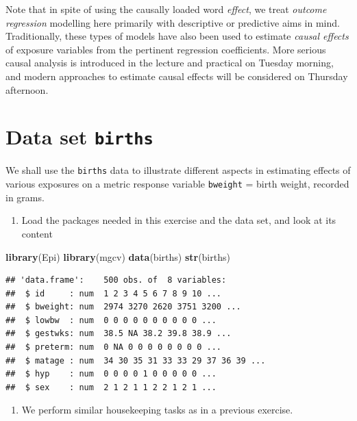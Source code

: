 \documentclass[
]{book}
\newenvironment{Shaded}{\begin{snugshade}}{\end{snugshade}}
\newcommand{\FunctionTok}[1]{\textcolor[rgb]{0.13,0.29,0.53}{\textbf{#1}}}
\newcommand{\NormalTok}[1]{#1}
\providecommand{\tightlist}{%
  \setlength{\itemsep}{0pt}\setlength{\parskip}{0pt}}
\begin{document}
Note that in spite of using the causally loaded word \emph{effect},
we treat \emph{outcome regression} modelling
here primarily with descriptive or predictive aims in mind.
Traditionally, these types of models have also been used
to estimate \emph{causal effects} of exposure variables
from the pertinent regression coefficients.
More serious causal analysis is introduced in the lecture and practical
on Tuesday morning, and modern approaches
to estimate causal effects will be considered
on Thursday afternoon.

\section{\texorpdfstring{Data set \texttt{births}}{Data set births}}\label{data-set-births}

We shall use the \texttt{births} data to illustrate
different aspects in estimating effects of various exposures on a metric response variable
\texttt{bweight} = birth weight, recorded in grams.

\begin{enumerate}
\def\labelenumi{\arabic{enumi}.}
\tightlist
\item
  Load the packages needed in this exercise and the data set, and look at its content
\end{enumerate}

\begin{Shaded}
\begin{Highlighting}[]
\FunctionTok{library}\NormalTok{(Epi)}
\FunctionTok{library}\NormalTok{(mgcv)}
\FunctionTok{data}\NormalTok{(births)}
\FunctionTok{str}\NormalTok{(births)}
\end{Highlighting}
\end{Shaded}

\begin{verbatim}
## 'data.frame':    500 obs. of  8 variables:
##  $ id     : num  1 2 3 4 5 6 7 8 9 10 ...
##  $ bweight: num  2974 3270 2620 3751 3200 ...
##  $ lowbw  : num  0 0 0 0 0 0 0 0 0 0 ...
##  $ gestwks: num  38.5 NA 38.2 39.8 38.9 ...
##  $ preterm: num  0 NA 0 0 0 0 0 0 0 0 ...
##  $ matage : num  34 30 35 31 33 33 29 37 36 39 ...
##  $ hyp    : num  0 0 0 0 1 0 0 0 0 0 ...
##  $ sex    : num  2 1 2 1 1 2 2 1 2 1 ...
\end{verbatim}

\begin{enumerate}
\def\labelenumi{\arabic{enumi}.}
\setcounter{enumi}{1}
\tightlist
\item
  We perform similar housekeeping tasks as in a previous exercise.
\end{enumerate}
\end{document}
